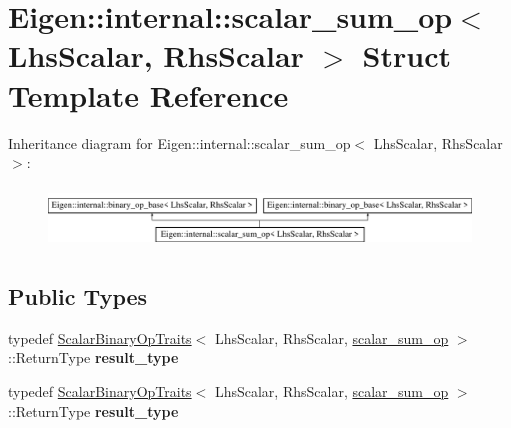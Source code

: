 \hypertarget{struct_eigen_1_1internal_1_1scalar__sum__op}{}\section{Eigen\+:\+:internal\+:\+:scalar\+\_\+sum\+\_\+op$<$ Lhs\+Scalar, Rhs\+Scalar $>$ Struct Template Reference}
\label{struct_eigen_1_1internal_1_1scalar__sum__op}
Inheritance diagram for Eigen\+:\+:internal\+:\+:scalar\+\_\+sum\+\_\+op$<$ Lhs\+Scalar, Rhs\+Scalar $>$\+:\begin{figure}[H]
\begin{center}
\leavevmode
\includegraphics[height=1.623188cm]{struct_eigen_1_1internal_1_1scalar__sum__op}
\end{center}
\end{figure}
\subsection*{Public Types}
\begin{DoxyCompactItemize}
\item 
\mbox{\label{struct_eigen_1_1internal_1_1scalar__sum__op_a3e94ce74f8d5793ccbba403af196f95d}} 
typedef \hyperlink{group___core___module_struct_eigen_1_1_scalar_binary_op_traits}{Scalar\+Binary\+Op\+Traits}$<$ Lhs\+Scalar, Rhs\+Scalar, \hyperlink{struct_eigen_1_1internal_1_1scalar__sum__op}{scalar\+\_\+sum\+\_\+op} $>$\+::Return\+Type {\bfseries result\+\_\+type}
\item 
\mbox{\label{struct_eigen_1_1internal_1_1scalar__sum__op_a3e94ce74f8d5793ccbba403af196f95d}} 
typedef \hyperlink{group___core___module_struct_eigen_1_1_scalar_binary_op_traits}{Scalar\+Binary\+Op\+Traits}$<$ Lhs\+Scalar, Rhs\+Scalar, \hyperlink{struct_eigen_1_1internal_1_1scalar__sum__op}{scalar\+\_\+sum\+\_\+op} $>$\+::Return\+Type {\bfseries result\+\_\+type}
\end{DoxyCompactItemize}
